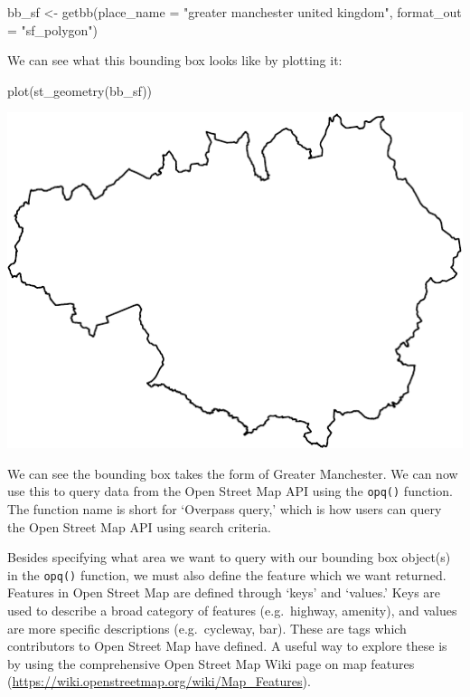 \documentclass[
]{book}
\newenvironment{Shaded}{\begin{snugshade}}{\end{snugshade}}
\newcommand{\AttributeTok}[1]{\textcolor[rgb]{0.77,0.63,0.00}{#1}}
\newcommand{\FunctionTok}[1]{\textcolor[rgb]{0.00,0.00,0.00}{#1}}
\newcommand{\NormalTok}[1]{#1}
\newcommand{\OtherTok}[1]{\textcolor[rgb]{0.56,0.35,0.01}{#1}}
\newcommand{\StringTok}[1]{\textcolor[rgb]{0.31,0.60,0.02}{#1}}
\begin{document}
\begin{Shaded}
\begin{Highlighting}[]
\NormalTok{bb\_sf }\OtherTok{\textless{}{-}} \FunctionTok{getbb}\NormalTok{(}\AttributeTok{place\_name =} \StringTok{"greater manchester united kingdom"}\NormalTok{, }\AttributeTok{format\_out =} \StringTok{"sf\_polygon"}\NormalTok{)}
\end{Highlighting}
\end{Shaded}

We can see what this bounding box looks like by plotting it:

\begin{Shaded}
\begin{Highlighting}[]
\FunctionTok{plot}\NormalTok{(}\FunctionTok{st\_geometry}\NormalTok{(bb\_sf))}
\end{Highlighting}
\end{Shaded}

\includegraphics{crime_mapping_files/figure-latex/plot_bb-1.pdf}

We can see the bounding box takes the form of Greater Manchester. We can now use this to query data from the Open Street Map API using the \texttt{opq()} function. The function name is short for `Overpass query,' which is how users can query the Open Street Map API using search criteria.

Besides specifying what area we want to query with our bounding box object(s) in the \texttt{opq()} function, we must also define the feature which we want returned. Features in Open Street Map are defined through `keys' and `values.' Keys are used to describe a broad category of features (e.g.~highway, amenity), and values are more specific descriptions (e.g.~cycleway, bar). These are tags which contributors to Open Street Map have defined. A useful way to explore these is by using the comprehensive Open Street Map Wiki page on map features (\url{https://wiki.openstreetmap.org/wiki/Map_Features}).
\end{document}

